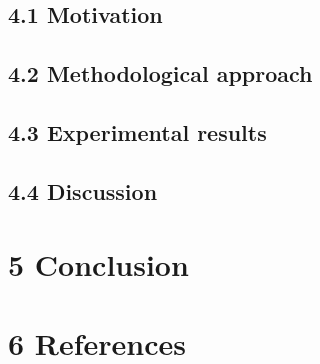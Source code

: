 \documentclass[authoryear,review,3p]{elsarticle}
\begin{document}
\subsection*{4.1 Motivation}
\subsection*{4.2 Methodological approach}
\subsection*{4.3 Experimental results}
\subsection*{4.4 Discussion}



\section*{5 Conclusion}



\bigskip
\section*{6 References}



\end{document}
